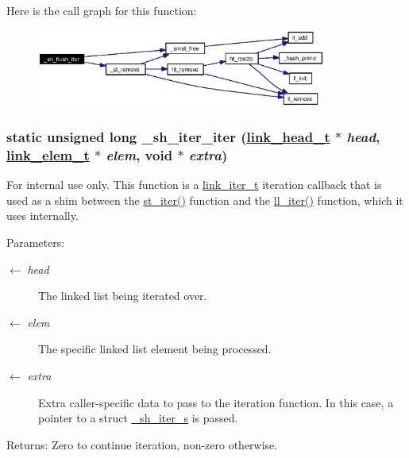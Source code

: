 Here is the call graph for this function:\begin{figure}[H]
\begin{center}
\leavevmode
\includegraphics[width=270pt]{group__dbprim__smat_ga28_cgraph}
\end{center}
\end{figure}
\hypertarget{group__dbprim__smat_ga29}{
\subsubsection[\_\-sh\_\-iter\_\-iter]{\setlength{\rightskip}{0pt plus 5cm}static unsigned long \_\-sh\_\-iter\_\-iter (\hyperlink{struct__link__head__s}{link\_\-head\_\-t} $\ast$ {\em head}, \hyperlink{struct__link__elem__s}{link\_\-elem\_\-t} $\ast$ {\em elem}, void $\ast$ {\em extra})}}
\label{group__dbprim__smat_ga29}


\begin{Desc}
\item[For internal use only.]
This function is a \hyperlink{group__dbprim__link_ga2}{link\_\-iter\_\-t} iteration callback that is used as a shim between the \hyperlink{group__dbprim__smat_ga14}{st\_\-iter()} function and the \hyperlink{group__dbprim__link_ga10}{ll\_\-iter()} function, which it uses internally.

\begin{Desc}
\item[Parameters:]
\begin{description}
\item[\mbox{$\leftarrow$} {\em head}]The linked list being iterated over. \item[\mbox{$\leftarrow$} {\em elem}]The specific linked list element being processed. \item[\mbox{$\leftarrow$} {\em extra}]Extra caller-specific data to pass to the iteration function. In this case, a pointer to a struct \hyperlink{struct__sh__iter__s}{\_\-sh\_\-iter\_\-s} is passed.\end{description}
\end{Desc}
\begin{Desc}
\item[Returns:]Zero to continue iteration, non-zero otherwise.\end{Desc}
\end{Desc}


